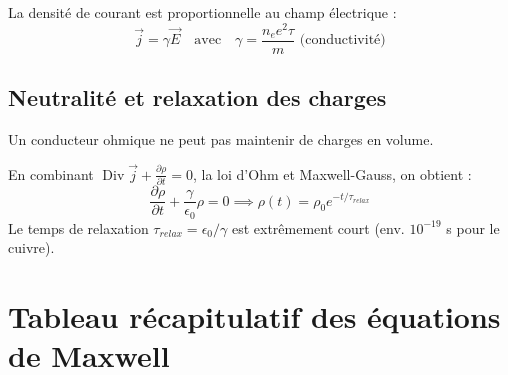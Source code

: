 \documentclass[french]{yLectureNote}
\renewcommand{\vec}{\overrightarrow}
\DeclareMathOperator{\Div}{Div}
\begin{document}
\begin{definition}
    La densité de courant est proportionnelle au champ électrique :
    \begin{equation}
        \vec{j} = \gamma \vec{E} \quad \text{avec} \quad \gamma = \frac{n_e e^2 \tau}{m} \text{ (conductivité)}
    \end{equation}
\end{definition}

\subsection{Neutralité et relaxation des charges}

Un conducteur ohmique ne peut pas maintenir de charges en volume.

\begin{theorem}
    En combinant $\Div \vec{j} + \frac{\partial \rho}{\partial t} = 0$, la loi d'Ohm et Maxwell-Gauss, on obtient :
    \begin{equation}
        \frac{\partial \rho}{\partial t} + \frac{\gamma}{\epsilon_0}\rho = 0 \implies \rho(t) = \rho_0 e^{-t/\tau_{relax}}
    \end{equation}
    Le temps de relaxation $\tau_{relax} = \epsilon_0/\gamma$ est extrêmement court (env. $10^{-19}$ s pour le cuivre).
\end{theorem}

\section{Tableau récapitulatif des équations de Maxwell}
\end{document}
